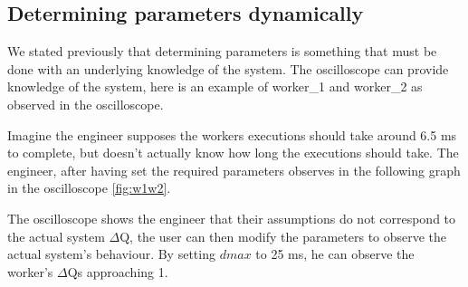     \subsection{Determining parameters dynamically}
        We stated previously that determining parameters is something that must be done with an underlying knowledge of the system. The oscilloscope can provide knowledge of the system, here is an example of worker\_1 and worker\_2 as observed in the oscilloscope.

        Imagine the engineer supposes the workers executions should take around 6.5 ms to complete, but doesn't actually know how long the executions should take. The engineer, after having set the required parameters observes in the following graph in the oscilloscope \cref{fig:w1w2}.

    The oscilloscope shows the engineer that their assumptions do not correspond to the actual system $\Delta$Q, the user can then modify the parameters to observe the actual system's behaviour. By setting $dmax$ to 25 ms, he can observe the worker's $\Delta$Qs approaching 1.

